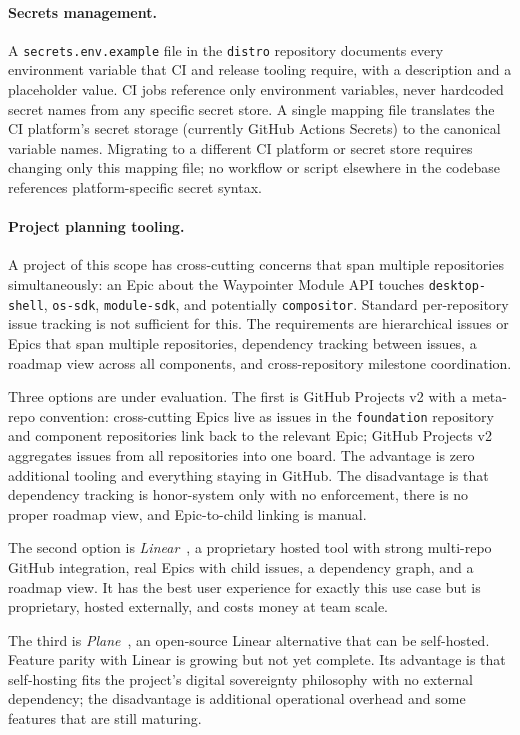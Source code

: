 \paragraph{Secrets management.}
A \texttt{secrets.env.example} file in the \texttt{distro} repository
documents every environment variable that CI and release tooling require, with
a description and a placeholder value. CI jobs reference only environment
variables, never hardcoded secret names from any specific secret store. A
single mapping file translates the CI platform's secret storage (currently
GitHub Actions Secrets) to the canonical variable names. Migrating to a
different CI platform or secret store requires changing only this mapping file;
no workflow or script elsewhere in the codebase references platform-specific
secret syntax.

\paragraph{Project planning tooling.}
A project of this scope has cross-cutting concerns that span multiple
repositories simultaneously: an Epic about the Waypointer Module API touches
\texttt{desktop-shell}, \texttt{os-sdk}, \texttt{module-sdk}, and potentially
\texttt{compositor}. Standard per-repository issue tracking is not sufficient
for this. The requirements are hierarchical issues or Epics that span multiple
repositories, dependency tracking between issues, a roadmap view across all
components, and cross-repository milestone coordination.

Three options are under evaluation. The first is GitHub Projects v2 with a
meta-repo convention: cross-cutting Epics live as issues in the
\texttt{foundation} repository and component repositories link back to the
relevant Epic; GitHub Projects v2 aggregates issues from all repositories into
one board. The advantage is zero additional tooling and everything staying
in GitHub. The disadvantage is that dependency tracking is honor-system only
with no enforcement, there is no proper roadmap view, and Epic-to-child
linking is manual.

The second option is \emph{Linear}~\cite{linear}, a proprietary hosted tool
with strong multi-repo GitHub integration, real Epics with child issues, a
dependency graph, and a roadmap view. It has the best user experience for
exactly this use case but is proprietary, hosted externally, and costs money
at team scale.

The third is \emph{Plane}~\cite{plane}, an open-source Linear alternative
that can be self-hosted. Feature parity with Linear is growing but not yet
complete. Its advantage is that self-hosting fits the project's digital
sovereignty philosophy with no external dependency; the disadvantage is
additional operational overhead and some features that are still maturing.

